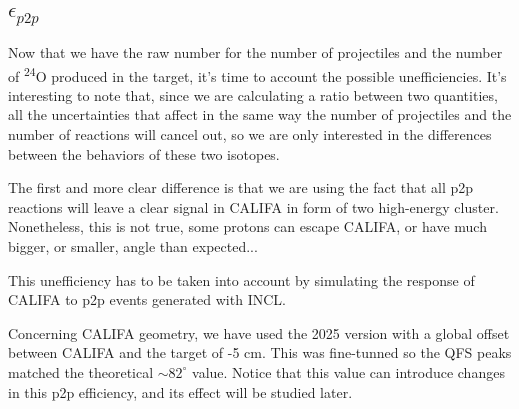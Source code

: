 \documentclass[12pt,a4paper]{article}
\begin{document}
\subsection{$\epsilon_{p2p}$}

Now that we have the raw number for the number of projectiles and the number of \textsuperscript{24}O produced in the target, it's time to account the possible unefficiencies. It's interesting to note that, since we are calculating a ratio between two quantities, all the uncertainties that affect in the same way the number of projectiles and the number of reactions will cancel out, so we are only interested in the differences between the behaviors of these two isotopes.

The first and more clear difference is that we are using the fact that all p2p reactions will leave a clear signal in CALIFA in form of two high-energy cluster. Nonetheless, this is not true, some protons can escape CALIFA, or have much bigger, or smaller, angle than expected...

This unefficiency has to be taken into account by simulating the response of CALIFA to p2p events generated with INCL.

Concerning CALIFA geometry, we have used the 2025 version with a global offset between CALIFA and the target of -5 cm. This was fine-tunned so the QFS peaks matched the theoretical $\sim 82^{\circ}$ value. Notice that this value can introduce changes in this p2p efficiency, and its effect will be studied later.



\end{document}
